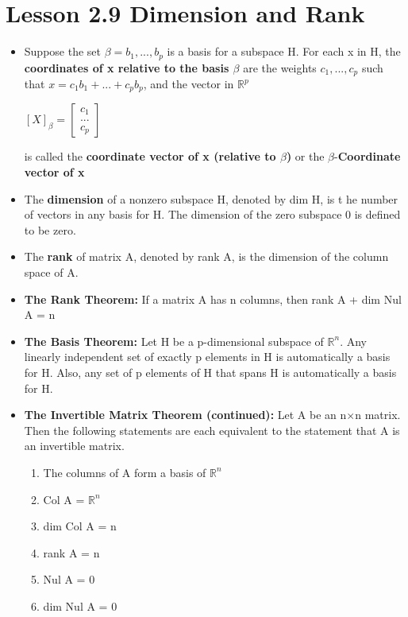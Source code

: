\documentclass{report}
\newcommand{\nxn}{n$\times$n}
\newcommand{\Rn}{$\mathbb{R}^n$}
\begin{document}
\section{Lesson 2.9 Dimension and Rank}
	\begin{itemize}\addtolength{\leftskip}{2em}
		\item Suppose the set $\beta = {b_1,...,b_p}$ is a basis for a subspace H. For each x in H, the \textbf{coordinates of x relative to the basis $\beta$} are the weights ${c_1,...,c_p}$ such that $x=c_1b_1+...+c_pb_p$, and the vector in $\mathbb{R}^p$
		\begin{center}
		$[X]_{\beta}=\begin{bmatrix}
		c_1\\
		...\\
		c_p
		\end{bmatrix}$
		\end{center}
		is called the \textbf{coordinate vector of x (relative to $\beta$)} or the $\beta$-\textbf{Coordinate vector of x}
		\item The \textbf{dimension} of a nonzero subspace H, denoted by dim H, is t he number of vectors in any basis for H. The dimension of the zero subspace {0} is defined to be zero.
		\item The \textbf{rank} of matrix A, denoted by rank A, is the dimension of the column space of A.
		\item \textbf{The Rank Theorem: }If a matrix A has n columns, then rank A + dim Nul A = n
		\item \textbf{The Basis Theorem: } Let H be a p-dimensional subspace of {\Rn}. Any linearly independent set of exactly p elements in H is automatically a basis for H. Also, any set of p elements of H that spans H is automatically a basis for H. 
		\item \textbf{The Invertible Matrix Theorem (continued): } \newline Let A be an {\nxn} matrix. Then the following statements are each equivalent to the statement that A is an invertible matrix.
		\begin{enumerate}\addtolength{\leftskip}{4em}
		\item The columns of A form a basis of {\Rn} 
		\item Col A = {\Rn} 
		\item dim Col A = n
		\item rank A = n
		\item Nul A = {0}
		\item dim Nul A = 0
		\end{enumerate}
	\end{itemize}
\end{document}
